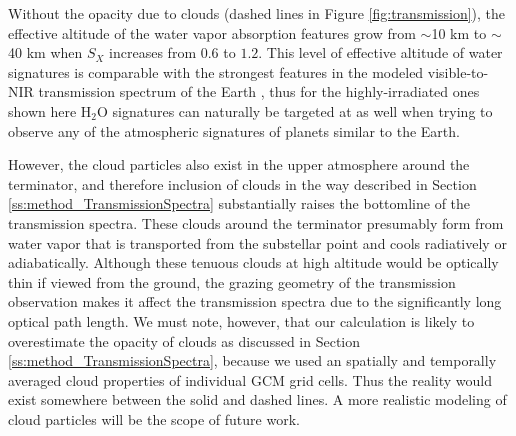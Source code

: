 \documentclass[11pt,numberedappendix,twocolappendix,]{emulateapj}
\def\water{H$_2$O }
\begin{document}
Without the opacity due to clouds (dashed lines in Figure \ref{fig:transmission}), the effective altitude of the water vapor absorption features grow from $\sim $10 km to $\sim $40 km when $S_X$ increases from $0.6$ to $1.2$. 
This level of effective altitude of water signatures is comparable with the strongest features in the modeled visible-to-NIR transmission spectrum of the Earth \citep[e.g.,][]{Kaltenegger2009}, thus for the highly-irradiated ones shown here \water signatures can naturally be targeted at as well when trying to observe any of the atmospheric signatures of planets similar to the Earth. 

However, the cloud particles also exist in the upper atmosphere around the terminator, and therefore inclusion of clouds in the way described in Section \ref{ss:method_TransmissionSpectra} substantially raises the bottomline of the transmission spectra. 
%
These clouds around the terminator presumably form from water vapor that is transported from the substellar point and cools radiatively or adiabatically. 
%
%
Although these tenuous clouds at high altitude would be optically thin if viewed  from the ground, the grazing geometry of the transmission observation makes it affect the transmission spectra due to the significantly long optical path length. 
We must note, however, that our calculation is likely to overestimate the opacity of clouds as discussed in Section \ref{ss:method_TransmissionSpectra}, because we used an spatially and temporally averaged cloud properties of individual GCM grid cells. 
Thus the reality would exist somewhere between the solid and dashed lines. 
A more realistic modeling of cloud particles will be the scope of future work. 
\end{document}
